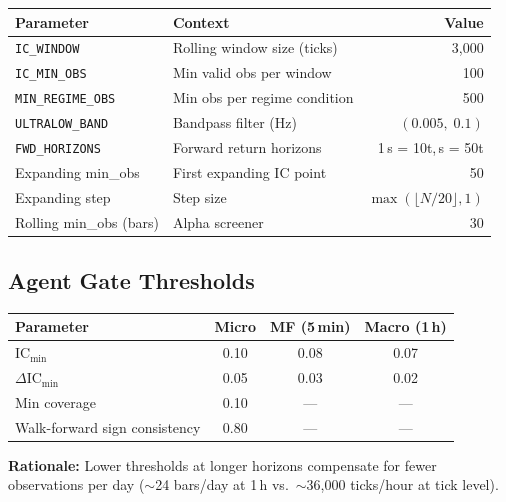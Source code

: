\documentclass[11pt,a4paper]{article}
\newcommand{\toprule}{\hline\hline}
\newcommand{\midrule}{\hline}
\newcommand{\bottomrule}{\hline\hline}
\begin{document}
\begin{center}
\begin{tabular}{llr}
    \toprule
    \textbf{Parameter} & \textbf{Context} & \textbf{Value} \\
    \midrule
    \texttt{IC\_WINDOW}     & Rolling window size (ticks) & 3{,}000 \\
    \texttt{IC\_MIN\_OBS}   & Min valid obs per window    & 100 \\
    \texttt{MIN\_REGIME\_OBS} & Min obs per regime condition & 500 \\
    \texttt{ULTRALOW\_BAND} & Bandpass filter (Hz)        & $(0.005,\; 0.1)$ \\
    \texttt{FWD\_HORIZONS}  & Forward return horizons     & 1\,s = 10t,\; 5\,s = 50t \\
    Expanding min\_obs      & First expanding IC point    & 50 \\
    Expanding step          & Step size                   & $\max(\lfloor N/20 \rfloor, 1)$ \\
    Rolling min\_obs (bars) & Alpha screener              & 30 \\
    \bottomrule
\end{tabular}
\end{center}

\subsection{Agent Gate Thresholds}

\begin{center}
\begin{tabular}{lccc}
    \toprule
    \textbf{Parameter} & \textbf{Micro} & \textbf{MF (5\,min)} & \textbf{Macro (1\,h)} \\
    \midrule
    $\mathrm{IC}_{\min}$          & 0.10 & 0.08 & 0.07 \\
    $\Delta\mathrm{IC}_{\min}$    & 0.05 & 0.03 & 0.02 \\
    Min coverage                   & 0.10 & ---  & ---  \\
    Walk-forward sign consistency  & 0.80 & ---  & ---  \\
    \bottomrule
\end{tabular}
\end{center}

\textbf{Rationale:} Lower thresholds at longer horizons compensate for
fewer observations per day ($\sim$24 bars/day at 1\,h vs.\ $\sim$36{,}000
ticks/hour at tick level).
\end{document}
